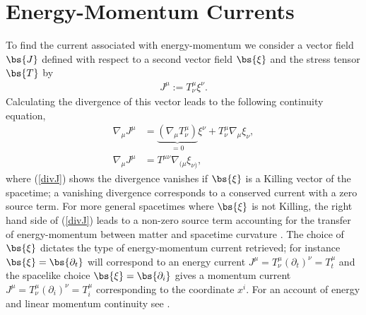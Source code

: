 \section{Energy-Momentum Currents} \label{sect:mattercont}
To find the current associated with energy-momentum we consider a vector field $\bs{J}$ defined with respect to a second vector field $\bs{\xi}$ and the stress tensor $\bs{T}$ by
\begin{align}
\label{Killing current}J^\mu := T^\mu_\nu \xi^\nu. 
\end{align}
Calculating the divergence of this vector leads to the following continuity equation,
\begin{align}
\nabla_\mu J^\mu &= \underbrace{(\nabla_\mu T^\mu_\nu )}_{=0}\xi^\nu + T^\mu_\nu \nabla_\mu  \xi_\nu, \\
\label{divJ}\nabla_\mu J^\mu &= T^{\mu\nu} \nabla_{(\mu}  \xi_{\nu)},
\end{align}
where (\ref{divJ}) shows the divergence vanishes if $\bs{\xi}$ is a Killing vector of the spacetime; a vanishing divergence corresponds to a conserved current with a zero source term. For more general spacetimes where $\bs{\xi}$ is not Killing, the right hand side of (\ref{divJ}) leads to a non-zero source term accounting for the transfer of energy-momentum between matter and spacetime curvature \cite{clough2021continuity}. The choice of $\bs{\xi}$ dictates the type of energy-momentum current retrieved; for instance $\bs{\xi} = \bs{\partial_t}$ will correspond to an energy current $J^\mu = T^\mu_\nu (\partial_t)^\nu = T^\mu_t$ and the spacelike choice $\bs{\xi} = \bs{\partial_i}$ gives a momentum current $J^\mu = T^\mu_\nu (\partial_i)^\nu=T^\mu_i$ corresponding to the coordinate $x^i$. For an account of energy and linear momentum continuity see \cite{clough2021continuity}.


